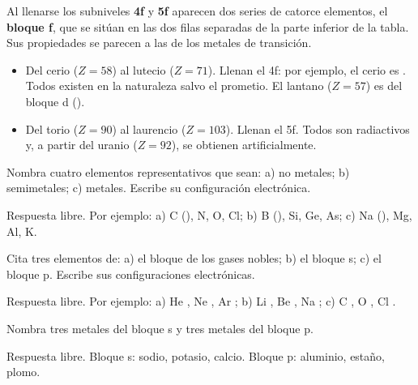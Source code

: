 Al llenarse los subniveles \textbf{4f} y \textbf{5f} aparecen dos series de catorce elementos, el \textbf{bloque f}, que se sitúan en las dos filas separadas de la parte inferior de la tabla. Sus propiedades se parecen a las de los metales de transición.

\begin{itemize}
    \item {} Del cerio (\(Z = 58\)) al lutecio (\(Z = 71\)). Llenan el 4f: por ejemplo, el cerio es . Todos existen en la naturaleza salvo el prometio. El lantano (\(Z = 57\)) es del bloque d ().
    \item {} Del torio (\(Z = 90\)) al laurencio (\(Z = 103\)). Llenan el 5f. Todos son radiactivos y, a partir del uranio (\(Z = 92\)), se obtienen artificialmente.
\end{itemize}

\begin{exercise}
    Nombra cuatro elementos representativos que sean: a) no metales; b) semimetales; c) metales. Escribe su configuración electrónica.
    \begin{solu}
        Respuesta libre. Por ejemplo: a) C (), N, O, Cl; b) B (), Si, Ge, As; c) Na (), Mg, Al, K.
    \end{solu}
\end{exercise}

\begin{exercise}
    Cita tres elementos de: a) el bloque de los gases nobles; b) el bloque s; c) el bloque p. Escribe sus configuraciones electrónicas.
    \begin{solu}
        Respuesta libre. Por ejemplo: a) He , Ne , Ar ; b) Li , Be , Na ; c) C , O , Cl .
    \end{solu}
\end{exercise}

\begin{exercise}
    Nombra tres metales del bloque s y tres metales del bloque p.
    \begin{solu}
        Respuesta libre. Bloque s: sodio, potasio, calcio. Bloque p: aluminio, estaño, plomo.
    \end{solu}
\end{exercise}


